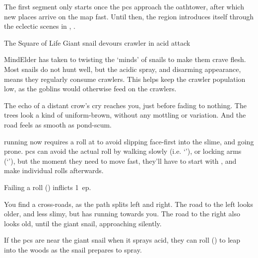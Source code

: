 \begin{multicols}{2}

\noindent
The first \gls{segment} only starts once the \glspl{pc} approach the \gls{oathtower}, after which new places arrive on the map fast.
Until then, the \gls{region} introduces itself through the eclectic scenes in , .

\label{ravencopsIntro}

{The Square of Life}%
{Giant snail devours \gls{crawler} in acid attack}%

\begin{exampletext}
  \Gls{MindElder} has taken to twisting the `minds' of snails to make them crave flesh.
  Most snails do not hunt well, but the acidic spray, and disarming appearance, means they regularly consume \glspl{crawler}.
  This helps keep the \gls{crawler} population low, as the goblins would otherwise feed on the \glspl{crawler}.
\end{exampletext}

\begin{boxtext}
  The echo of a distant crow's cry reaches you, just before fading to nothing.
  The trees look a kind of uniform-brown, without any mottling or variation.
  And the road feels as smooth as pond-scum.
\end{boxtext}

\Gls{running} now requires a  roll at \tn[7] to avoid slipping face-first into the slime, and going prone.%
\Glspl{pc} can avoid the actual roll by walking slowly (i.e. `'), or locking arms (`'), but the moment they need to move fast, they'll have to start with , and make individual rolls afterwards.

Failing a  roll (\tn[7]) inflicts 1~\gls{ep}.

\begin{boxtext}
  You find a cross-roads, as the path splits left and right.
  The road to the left looks older, and less slimy, but has  running towards you.
  The road to the right also looks old, until the giant snail, approaching silently.
\end{boxtext}

If the \glspl{pc} are near the giant snail when it sprays acid, they can roll  (\tn[7]) to leap into the woods as the snail prepares to spray.


\end{multicols}
